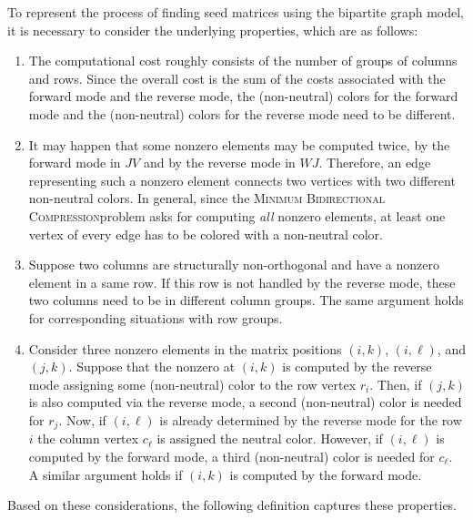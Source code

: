 \documentclass[12pt, twoside,a4paper,toc=bibliography]{scrbook}
\newcommand{\MinBidCom}{\textsc{Minimum Bidirectional Compression}}
\begin{document}
To represent the process of finding seed matrices using the bipartite graph model, it is
necessary to consider the underlying properties, which are as follows:
\begin{enumerate}
\item The computational cost roughly consists of the number of groups of columns and
rows. Since the overall cost is the sum of the costs associated with the forward mode
and the reverse mode, the (non-neutral) colors for the forward mode and the
(non-neutral) colors for the reverse mode need to be different.

\item It may happen that some nonzero
elements may be computed twice, by the forward mode in $JV$ and by the reverse mode
in $WJ$. Therefore, an edge representing such a nonzero element connects two
vertices with two different non-neutral colors. In general, since the
\MinBidCom problem asks for computing \emph{all} nonzero elements, at least one vertex of
every edge has to be colored with a non-neutral color.

\item Suppose two columns are structurally non-orthogonal and have a nonzero element in a
same row. If this row is not handled by the reverse mode, these two columns need to
be in different column groups. The same argument holds for corresponding situations
with row groups.

\item Consider three nonzero elements in the matrix positions $(i,k)$, $(i,\ell)$, and
$(j,k)$. Suppose that the nonzero at $(i,k)$ is computed by the reverse mode
assigning some (non-neutral) color to the row vertex $r_i$. Then, if $(j,k)$ is
also computed via the reverse mode, a second (non-neutral) color is needed for
$r_j$. Now, if $(i,\ell)$ is already determined by the reverse mode for the row $i$ the
column vertex $c_\ell$ is assigned the neutral color. However, if $(i,\ell)$ is
computed by the forward mode, a third (non-neutral) color is needed for $c_\ell$. A
similar argument holds if $(i,k)$ is computed by the forward mode.
\end{enumerate}

Based on these considerations, the following definition captures these properties.
\end{document}
